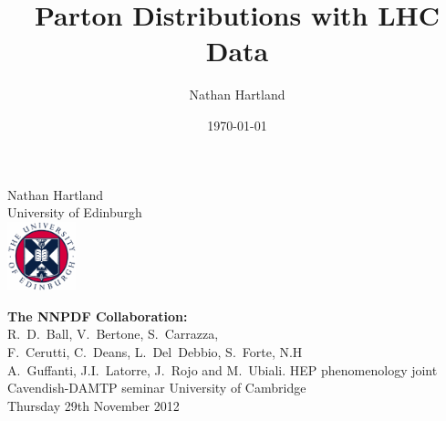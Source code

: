 \documentclass[10pt]{beamer}
\title[]{Parton Distributions with LHC Data}
\author{Nathan Hartland}
\institute
{
University of Edinburgh\\
\medskip
}
\date{\today}
\newcommand{\vso}{\vskip15pt}
\begin{document}
\renewcommand{\inserttotalframenumber}{36}


\begin{frame}
\begin{centering}
\vskip20pt
\vskip20pt
Nathan Hartland\\

\small{University of Edinburgh}\\
\vso
\includegraphics[height=2cm]{edinburghcrest.pdf}

\vskip10pt
{\bf The NNPDF Collaboration:}\\
R.~D.~Ball, V.~Bertone, S.~Carrazza,\\ F.~Cerutti,
C.~Deans, L.~Del~Debbio, S.~Forte, N.H\\
A.~Guffanti, J.I.~Latorre, J.~Rojo and M.~Ubiali. 
\vskip20pt
HEP phenomenology joint Cavendish-DAMTP seminar
University of Cambridge\\
Thursday 29th November 2012

\end{centering}

\end{frame}
\end{document}
